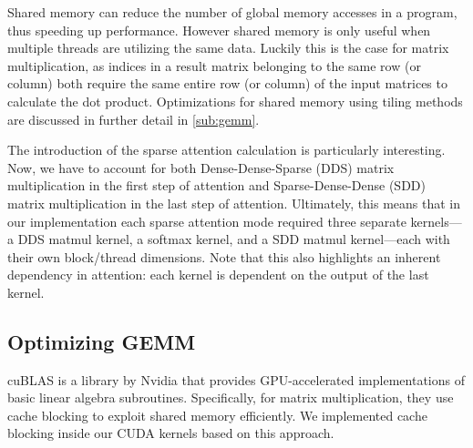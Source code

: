 \documentclass[11pt]{article}
\begin{document}
Shared memory can reduce the number of global memory accesses in a program, thus speeding up performance. However shared memory is only useful when multiple threads are utilizing the same data. Luckily this is the case for matrix multiplication, as indices in a result matrix belonging to the same row (or column) both require the same entire row (or column) of the input matrices to calculate the dot product. Optimizations for shared memory using tiling methods are discussed in further detail in \autoref{sub:gemm}.

The introduction of the sparse attention calculation is particularly interesting. Now, we have to account for both Dense-Dense-Sparse (DDS) matrix multiplication in the first step of attention and Sparse-Dense-Dense (SDD) matrix multiplication in the last step of attention. Ultimately, this means that in our implementation each sparse attention mode required three separate kernels---a DDS matmul kernel, a softmax kernel, and a SDD matmul kernel---each with their own block/thread dimensions. Note that this also highlights an inherent dependency in attention: each kernel is dependent on the output of the last kernel.

\subsection{Optimizing GEMM} \label{sub:gemm}
cuBLAS \cite{cuBLAS} is a library by Nvidia that provides GPU-accelerated implementations of basic linear algebra subroutines. 
Specifically, for matrix multiplication, they use cache blocking to exploit shared memory efficiently.
We implemented cache blocking inside our CUDA kernels based on this approach.
\end{document}
